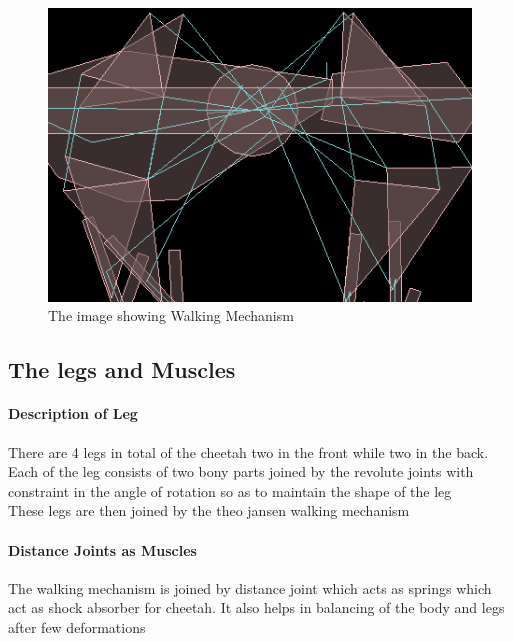 \documentclass[11pt]{article}
\begin{document}
\paragraph{}
\begin{figure}[!ht]
    \centering
        \includegraphics[scale=0.6]{jansen.png}
        \caption{The image showing Walking Mechanism}
\end{figure}


\subsection{The legs and Muscles}
\paragraph{Description of Leg}
There are 4 legs in total of the cheetah two in the front while two in the back. Each of the leg consists of two bony parts joined by the revolute joints with constraint in  the angle of rotation so as to maintain the shape of the leg\\
These legs are then joined by the theo jansen walking mechanism
\paragraph{Distance Joints as Muscles}
The walking mechanism is joined by distance joint which acts as springs which act as shock absorber for cheetah. It also helps in balancing of the body and legs after few deformations
\end{document}
